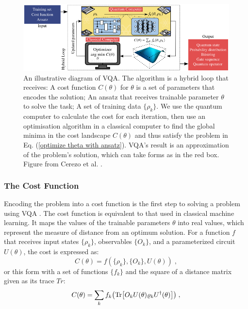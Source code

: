 \begin{figure}
    \centering
    \includegraphics[width=\textwidth]{LiteratureReview/Appendices/vqadiagram.png}
    \caption{
    An illustrative diagram of VQA. 
    The algorithm is a hybrid loop that receives: 
    A cost function $C(\theta)$ for $\theta$ is a set of parameters that encodes the solution; 
    An ansatz that receives trainable parameter $\theta$ to solve the task;
    A set of training data $\{\rho_k\}$.
    We use the quantum computer to calculate the cost for each iteration, then use an optimisation algorithm in a classical computer to find the global minima in the cost landscape $C(\theta)$ and thus satisfy the problem in Eq. (\ref{optimize theta with ansatz}).
    VQA's result is an approximation of the problem's solution, which can take forms as in the red box.
    Figure from Cerezo et al. \cite{cerezo2021variational}.
    }
    \label{VQA diagram}
\end{figure}

\subsubsection{The Cost Function}
Encoding the problem into a cost function is the first step to solving a problem using VQA \cite{cerezo2021variational}.
The cost function is equivalent to that used in classical machine learning. 
It maps the values of the trainable parameters $\theta$ into real values, which represent the measure of distance from an optimum solution.
For a function $f$ that receives input states $\{\rho_k\}$, observables $\{O_k\}$, and a parameterized circuit $U(\theta)$, the cost is expressed as:
\begin{equation}
    C(\theta) = f(\{\rho_k\}, \{O_k\}, U(\theta)) \;,
\end{equation}
or this form with a set of functions $\{ f_k \}$ and the square of a distance matrix given as its trace $Tr$:
\begin{equation}
    C(\theta) = \sum_k f_k \left(\Tr[ O_k U(\theta) \rho_k U^\dagger(\theta) ]\right) \;,
    \label{Cost function}
\end{equation}

